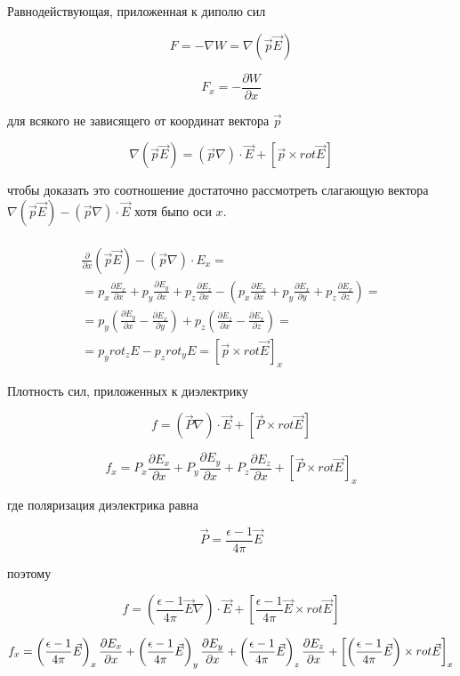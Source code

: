 \documentclass[11pt]{article}
\begin{document}
Равнодействующая, приложенная к диполю сил

\[F = - \nabla W = \nabla \left(\vec {p} \vec{E} \right)\]

\[F_x = -\frac{\partial W}{\partial x}\]

для всякого не зависящего от координат вектора \(\vec{p}\)

\[\nabla \left(\vec {p} \vec{E} \right) = \left(\vec {p} \nabla \right) \cdot \vec {E} + \left[\vec{p} \times rot \vec{E}\right]\]

чтобы доказать это соотношение достаточно рассмотреть слагающую вектора
\(\nabla \left(\vec {p} \vec{E} \right) - \left(\vec {p} \nabla \right) \cdot \vec {E}\)
хотя быпо оси \(x\).

\[\begin{array}{c} \\
\frac{\partial}{\partial x} \left(\vec {p} \vec{E} \right) - \left(\vec {p} \nabla \right) \cdot E_x = \\
= p_x \frac{\partial E_x}{\partial x} + p_y \frac{\partial E_y}{\partial x} + p_z \frac{\partial E_z}{\partial x} - \left(p_x \frac{\partial E_x}{\partial x} + p_y \frac{\partial E_x}{\partial y} + p_z \frac{\partial E_x}{\partial z}\right) = \\
= p_y \left( \frac{\partial E_y}{\partial x} - \frac{\partial E_x}{\partial y} \right)
+ p_z \left( \frac{\partial E_z}{\partial x} - \frac{\partial E_x}{\partial z} \right) =\\
= p_y rot_z E - p_z rot_y E = \left[\vec {p} \times rot \vec {E}\right]_x
\end{array}\]

    Плотность сил, приложенных к диэлектрику

\[
f = \left(\vec {P} \nabla \right) \cdot \vec {E} + \left[\vec{P} \times rot \vec{E}\right]
\]

    \[
f_x
= P_x \frac{\partial E_x}{\partial x}
+ P_y \frac{\partial E_y}{\partial x}
+ P_z \frac{\partial E_z}{\partial x}
+\left[\vec{P} \times rot \vec{E}\right]_x
\]

    где поляризация диэлектрика равна

\[ \vec{P} = \frac{\epsilon - 1}{4 \pi}\vec{E} \]

поэтому

\[
f = \left(\frac{\epsilon - 1}{4 \pi}\vec{E} \nabla \right) \cdot \vec {E} + \left[\frac{\epsilon - 1}{4 \pi}\vec{E} \times rot \vec{E}\right]
\]

    \[
f_x
= \left(\frac{\epsilon - 1}{4 \pi}\vec{E}\right)_x \frac{\partial E_x}{\partial x} \\
+ \left(\frac{\epsilon - 1}{4 \pi}\vec{E}\right)_y \frac{\partial E_y}{\partial x} \\
+ \left(\frac{\epsilon - 1}{4 \pi}\vec{E}\right)_z \frac{\partial E_z}{\partial x} \\
+ \left[\left(\frac{\epsilon - 1}{4 \pi}\vec{E}\right) \times rot \vec{E}\right]_x
\]
\end{document}
